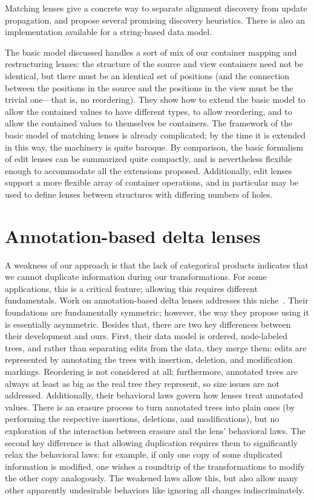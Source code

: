 Matching lenses give a concrete way to separate alignment discovery from
update propagation, and propose several promising discovery heuristics.
There is also an implementation available for a string-based data model.

The basic model discussed handles a sort of mix of our container mapping and
restructuring lenses: the structure of the source and view containers need
not be identical, but there must be an identical set of positions (and the
connection between the positions in the source and the positions in the view
must be the trivial one---that is, no reordering). They show how to extend
the basic model to allow the contained values to have different types, to
allow reordering, and to allow the contained values to themselves be
containers. The framework of the basic model of matching lenses is already
complicated; by the time it is extended in this way, the machinery is quite
baroque. By comparison, the basic formalism of edit lenses can be summarized
quite compactly, and is nevertheless flexible enough to accommodate all the
extensions proposed. Additionally, edit lenses support a more flexible array
of container operations, and in particular may be used to define lenses
between structures with differing numbers of holes.

\section{Annotation-based delta lenses}
\label{sec:annotations}
A weakness of our approach is that the lack of categorical products
indicates that we cannot duplicate information during our transformations.
For some applications, this is a critical feature; allowing this requires
different fundamentals. Work on annotation-based delta lenses addresses this
niche~\cite{Hu04,HuEditor08,MuAlgebraic2004}. Their foundations are
fundamentally symmetric; however, the way they propose using it is
essentially asymmetric. Besides that, there are two key differences between
their development and ours. First, their data model is ordered, node-labeled
trees, and rather than separating edits from the data, they merge them:
edits are represented by annotating the trees with insertion, deletion, and
modification markings. Reordering is not considered at all; furthermore,
annotated trees are always at least as big as the real tree they represent,
so size issues are not addressed. Additionally, their behavioral laws govern
how lenses treat annotated values. There is an erasure process to turn
annotated trees into plain ones (by performing the respective insertions,
deletions, and modifications), but no exploration of the interaction between
erasure and the lens' behavioral laws. The second key difference is that
allowing duplication requires them to significantly relax the behavioral
laws: for example, if only one copy of some duplicated information is
modified, one wishes a roundtrip of the transformations to modify the other
copy analogously. The weakened laws allow this, but also allow many other
apparently undesirable behaviors like ignoring all changes indiscriminately.

